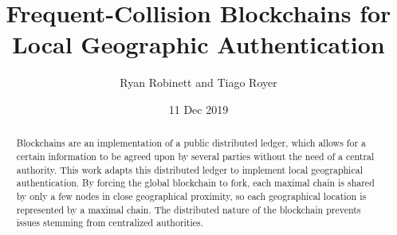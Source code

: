 \documentclass[twocolumn,10pt]{article}
\begin{document}
\title{Frequent-Collision Blockchains for Local Geographic Authentication}
\author{Ryan Robinett and Tiago Royer}
\date{11 Dec 2019}
\maketitle

\begin{abstract}
	Blockchains are an implementation of a public distributed ledger,
	which allows for a certain information to be agreed upon by several parties
	without the need of a central authority.
	This work adapts this distributed ledger
	to implement local geographical authentication.
	By forcing the global blockchain to fork,
	each maximal chain is shared by only a few nodes in close geographical proximity,
	so each geographical location is represented by a maximal chain.
	The distributed nature of the blockchain
	prevents issues stemming from centralized authorities.
\end{abstract}

















\end{document}
